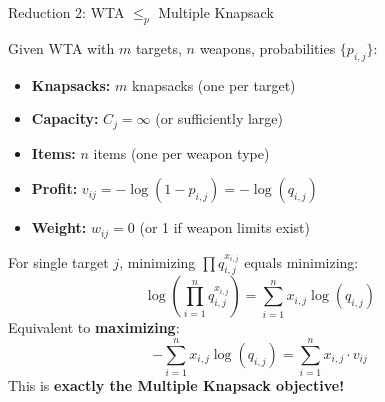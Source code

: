 \documentclass[aspectratio=169,10pt]{beamer}
\begin{document}
\begin{frame}{Reduction 2: WTA $\leq_p$ Multiple Knapsack}


  \vspace{0.15cm}
  {\footnotesize
  Given WTA with $m$ targets, $n$ weapons, probabilities $\{p_{i,j}\}$:
  \begin{itemize}
    \setlength\itemsep{2pt}
    \item[\color{goldaccent}$\blacktriangleright$] \textbf{Knapsacks:} $m$ knapsacks (one per target)
    \item[\color{goldaccent}$\blacktriangleright$] \textbf{Capacity:} $C_j = \infty$ (or sufficiently large)
    \item[\color{goldaccent}$\blacktriangleright$] \textbf{Items:} $n$ items (one per weapon type)
    \item[\color{goldaccent}$\blacktriangleright$] \textbf{Profit:} $v_{ij} = -\log(1-p_{i,j}) = -\log(q_{i,j})$
    \item[\color{goldaccent}$\blacktriangleright$] \textbf{Weight:} $w_{ij} = 0$ (or 1 if weapon limits exist)
  \end{itemize}
  }

  \vspace{0.25cm}


  \vspace{0.15cm}
  {\footnotesize
  For single target $j$, minimizing $\prod q_{i,j}^{x_{i,j}}$ equals minimizing:
  \[
    \log\left(\prod_{i=1}^{n} q_{i,j}^{x_{i,j}}\right) = \sum_{i=1}^{n} x_{i,j} \log(q_{i,j})
  \]
  Equivalent to \textbf{maximizing}:
  \[
    -\sum_{i=1}^{n} x_{i,j}\log(q_{i,j}) = \sum_{i=1}^{n} x_{i,j} \cdot v_{ij}
  \]
  This is \textbf{exactly the Multiple Knapsack objective!}
  }

\end{frame}
\end{document}
